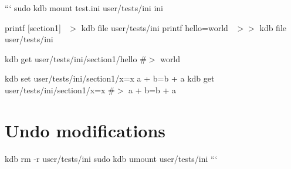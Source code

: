 ``` sudo kdb mount test.\+ini user/tests/ini ini

printf \textquotesingle{}\mbox{[}section1\mbox{]}~\newline
\textquotesingle{} $>$ {\ttfamily kdb file user/tests/ini} printf \textquotesingle{}hello=world~\newline
\textquotesingle{} $>$$>$ {\ttfamily kdb file user/tests/ini}

kdb get user/tests/ini/section1/hello \#$>$ world

kdb set user/tests/ini/section1/x=x \textquotesingle{}a + b=b + a\textquotesingle{} kdb get user/tests/ini/section1/x=x \#$>$ a + b=b + a\hypertarget{autotoc_md289_autotoc_md317}{}\section{Undo modifications}\label{autotoc_md289_autotoc_md317}
kdb rm -\/r user/tests/ini sudo kdb umount user/tests/ini ``` 